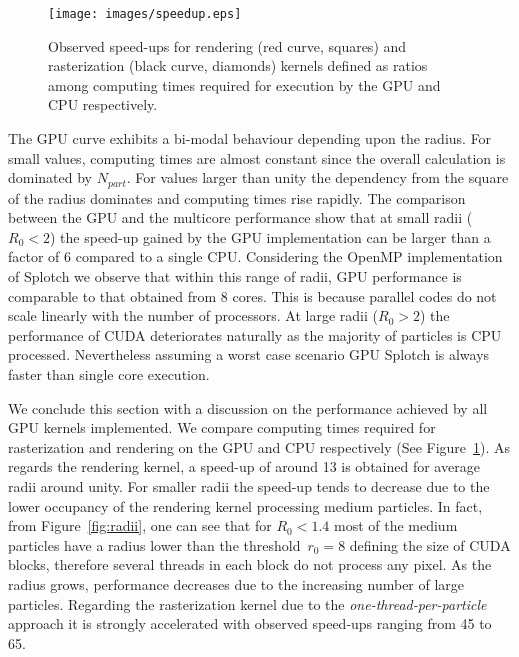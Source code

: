 \documentclass[1p]{elsarticle}
\begin{document}
\begin{figure}
\centering
\texttt{[image: images/speedup.eps]}
\caption{
Observed speed-ups for rendering (red curve, squares) and rasterization (black curve, diamonds) kernels defined as ratios among computing times required for execution by the GPU and CPU respectively.
}
\label{fig:speedup}
\end{figure}

The GPU curve exhibits a bi-modal behaviour depending upon the radius. For small values, computing times are almost constant since the overall calculation is dominated by $N_{part}$. For values larger than unity the dependency from the square of the radius dominates and computing times rise rapidly. The comparison between the GPU and the multicore performance show that at small radii ($R_0 < 2$) the speed-up gained by the GPU implementation can be larger than a factor of 6 compared to a single CPU. Considering the OpenMP implementation of Splotch we observe that within this range of radii, GPU performance is comparable to that obtained from 8 cores. This is because parallel codes do not scale linearly with the number of processors. At large radii ($R_0 > 2$) the performance of CUDA deteriorates naturally as the majority of particles is CPU processed. Nevertheless assuming a worst case scenario GPU Splotch is always faster than single core execution. 

We conclude this section with a discussion on the performance achieved by all GPU kernels implemented. 
We compare computing times required for rasterization and rendering on the 
GPU and CPU respectively (See Figure~\ref{fig:speedup}). 
As regards the rendering kernel, a speed-up of around 13 is obtained for average radii around unity. For smaller radii the speed-up
tends to decrease due to the lower occupancy of the rendering kernel processing medium particles.
In fact, from Figure~\ref{fig:radii}, one can see that for $R_0<1.4$ most of the medium particles have a radius lower than the threshold~$r_0=8$ defining the size of CUDA blocks, therefore several threads in each block do not process any pixel.
As the radius grows, performance decreases due to the increasing number of large particles.
Regarding the rasterization kernel due to the {\it one-thread-per-particle} approach it is strongly accelerated with observed speed-ups ranging from 45 to 65.  
\end{document}
